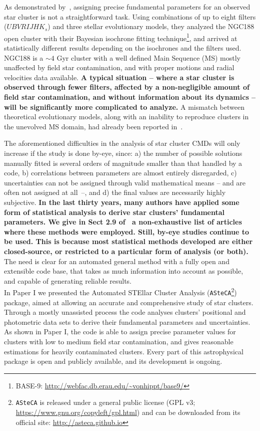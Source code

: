\documentclass[referee]{aa}
\begin{document}
As demonstrated by~\cite{Hills_2015}, assigning precise fundamental
parameters for an observed star cluster is not a straightforward task.
Using combinations of up to eight filters ($UBVRIJHK_s$) and three stellar
evolutionary models, they analyzed the NGC188 open cluster with their
Bayesian isochrone fitting technique\footnote{BASE-9: 
\url{http://webfac.db.erau.edu/~vonhippt/base9/}}, and arrived at statistically
different results depending on the isochrones and the filters used.
%
NGC188 is a ${\sim}4$ Gyr cluster with a well defined Main Sequence (MS) mostly
unaffected by field star contamination, and with proper motions and radial
velocities data available.
\textbf{A typical situation -- where a star cluster is observed through fewer
filters, affected by a non-negligible amount of field star contamination, and
without information about its dynamics -- will be significantly more
complicated to analyze.}
%
A mismatch between theoretical evolutionary models, along with an
inability to reproduce clusters in the unevolved MS domain, had already
been reported in~\cite{Grocholski_2003}.

The aforementioned difficulties in the analysis of star cluster CMDs will only
increase if the study is done by-eye, since: a) the number of possible solutions
manually fitted is several orders of magnitude smaller than that handled by a
code, b) correlations between parameters are almost entirely disregarded, c)
uncertainties can not be assigned through valid mathematical
means -- and are often not assigned at \mbox{all --}, and d) the final values
are necessarily highly subjective.
%
\textbf{In the last thirty years, many authors have applied some form of
statistical analysis to derive star clusters' fundamental parameters.
We give in Sect 2.9 of~\citet[][hereafter Paper I]{Perren_2015} a non-exhaustive
list of articles where these methods were employed.
%
Still, by-eye studies continue to be used. This is because most statistical
methods developed are either closed-source, or restricted to a particular form
of analysis (or both).}
%
The need is clear for an automated general method with a fully open
and extensible code base, that takes as much information into account as
possible, and capable of generating reliable results.\\

In Paper I we presented the Automated STEllar
Cluster Analysis (\texttt{ASteCA}\footnote{\texttt{ASteCA} is released under a
general public license (GPL v3; \url{https://www.gnu.org/copyleft/gpl.html}) and
can be downloaded from its official site: \url{http://asteca.github.io}})
package, aimed at allowing an accurate and comprehensive study of star clusters.
%
Through a mostly unassisted process the code analyses clusters' positional
and photometric data sets to derive their fundamental parameters and
uncertainties.
As shown in Paper I, the code is able to assign precise parameter values for
clusters with low to medium field star contamination, and gives reasonable
estimations for heavily contaminated clusters. Every part of this astrophysical
package is open and publicly available, and its development is ongoing.
\end{document}
